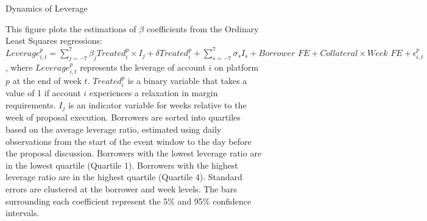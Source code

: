 \begin{landscape}
\begin{figure}[ht!]
\centering
\caption{Dynamics of Leverage}\label{fig:dynamics_lev}
\caption*{This figure plots the estimations of $\beta$ coefficients from the Ordinary Least Squares regressions: $Leverage_{i,t}^{p}=\sum_{j=-7}^{7}\beta_jTreated_{i}^p\times I_j+\delta Treated_{i}^p+\sum_{s=-7}^{7}\sigma_sI_s+\textit{Borrower FE} + \textit{Collateral}\times\textit{Week FE}+\epsilon_{i,t}^p$, where $Leverage_{i,t}^{p}$ represents the leverage of account $i$ on platform $p$ at the end of week $t$. $Treated_{i}^{p}$ is a binary variable that takes a value of 1 if account $i$ experiences a relaxation in margin requirements. $I_j$ is an indicator variable for weeks relative to the week of proposal execution. Borrowers are sorted into quartiles based on the average leverage ratio, estimated using daily observations from the start of the event window to the day before the proposal discussion. Borrowers with the lowest leverage ratio are in the lowest quartile (Quartile 1). Borrowers with the highest leverage ratio are in the highest quartile (Quartile 4). Standard errors are clustered at the borrower and week levels. The bars surrounding each coefficient represent the 5\% and 95\% confidence intervals. }
\end{figure}

\end{landscape}

